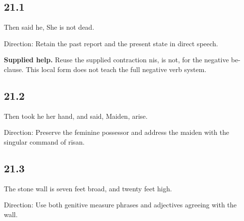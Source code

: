 \subsection*{21.1}

\par\begin{minipage}{\linewidth}\raggedright
Then said he, She is not dead.

Direction: Retain the past report and the present state in direct speech.

\textbf{Supplied help.} Reuse the supplied contraction nis, is not, for the negative be-clause. This local form does not teach the full negative verb system.

\end{minipage}\par\addvspace{4pt}

\subsection*{21.2}

\par\begin{minipage}{\linewidth}\raggedright
Then took he her hand, and said, Maiden, arise.

Direction: Preserve the feminine possessor and address the maiden with the singular command of rīsan.

\end{minipage}\par\addvspace{4pt}

\subsection*{21.3}

\par\begin{minipage}{\linewidth}\raggedright
The stone wall is seven feet broad, and twenty feet high.

Direction: Use both genitive measure phrases and adjectives agreeing with the wall.

\end{minipage}\par\addvspace{4pt}

